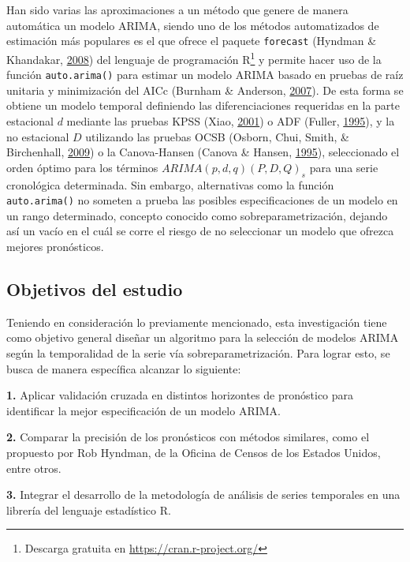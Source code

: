 \documentclass[
]{article}
\begin{document}
Han sido varias las aproximaciones a un método que genere de manera
automática un modelo ARIMA, siendo uno de los métodos automatizados de
estimación más populares es el que ofrece el paquete \texttt{forecast}
(Hyndman \& Khandakar, \protect\hyperlink{ref-auto.arima}{2008}) del
lenguaje de programación R\footnote{Descarga gratuita en
  \url{https://cran.r-project.org/}} y permite hacer uso de la función
\texttt{auto.arima()} para estimar un modelo ARIMA basado en pruebas de
raíz unitaria y minimización del AICc (Burnham \& Anderson,
\protect\hyperlink{ref-burnham2007model}{2007}). De esta forma se
obtiene un modelo temporal definiendo las diferenciaciones requeridas en
la parte estacional \(d\) mediante las pruebas KPSS (Xiao,
\protect\hyperlink{ref-doi:10.1111ux2f1467-9892.00213}{2001}) o ADF
(Fuller, \protect\hyperlink{ref-fuller1995introduction}{1995}), y la no
estacional \(D\) utilizando las pruebas OCSB (Osborn, Chui, Smith, \&
Birchenhall, \protect\hyperlink{ref-Osborn2009SEASONALITYAT}{2009}) o la
Canova-Hansen (Canova \& Hansen,
\protect\hyperlink{ref-10.2307ux2f1392184}{1995}), seleccionado el orden
óptimo para los términos \(ARIMA(p, d, q)(P, D, Q)_s\) para una serie
cronológica determinada. Sin embargo, alternativas como la función
\texttt{auto.arima()} no someten a prueba las posibles especificaciones
de un modelo en un rango determinado, concepto conocido como
sobreparametrización, dejando así un vacío en el cuál se corre el riesgo
de no seleccionar un modelo que ofrezca mejores pronósticos.

\subsection{Objetivos del estudio}

Teniendo en consideración lo previamente mencionado, esta investigación
tiene como objetivo general diseñar un algoritmo para la selección de
modelos ARIMA según la temporalidad de la serie vía
sobreparametrización. Para lograr esto, se busca de manera específica
alcanzar lo siguiente:

\textbf{1.} Aplicar validación cruzada en distintos horizontes de
pronóstico para identificar la mejor especificación de un modelo ARIMA.

\textbf{2.} Comparar la precisión de los pronósticos con métodos
similares, como el propuesto por Rob Hyndman, de la Oficina de Censos de
los Estados Unidos, entre otros.

\textbf{3.} Integrar el desarrollo de la metodología de análisis de
series temporales en una librería del lenguaje estadístico R.
\end{document}
